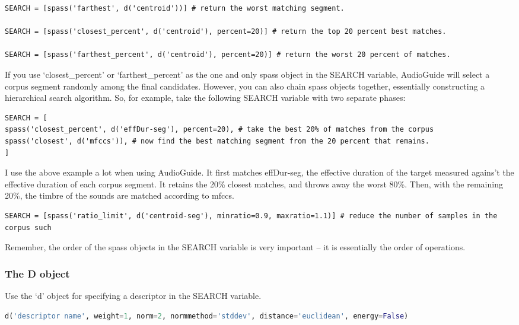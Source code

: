 \documentclass{article}
\newcommand{\ag}{AudioGuide}
\begin{document}
\begin{spacing}{1.2}
\begin{lstlisting}
SEARCH = [spass('farthest', d('centroid'))] # return the worst matching segment.

SEARCH = [spass('closest_percent', d('centroid'), percent=20)] # return the top 20 percent best matches.

SEARCH = [spass('farthest_percent', d('centroid'), percent=20)] # return the worst 20 percent of matches.
\end{lstlisting}

If you use `closest\_percent' or `farthest\_percent' as the one and only spass object in the SEARCH variable, AudioGuide will select a corpus segment randomly among the final candidates.  However, you can also chain spass objects together, essentially constructing a hierarchical search algorithm.  So, for example, take the following SEARCH variable with two separate phases:

\begin{lstlisting}
SEARCH = [
spass('closest_percent', d('effDur-seg'), percent=20), # take the best 20% of matches from the corpus
spass('closest', d('mfccs')), # now find the best matching segment from the 20 percent that remains.
] 
\end{lstlisting}

I use the above example a lot when using \ag.  It first matches effDur-seg, the effective duration of the target measured agains't the effective duration of each corpus segment.  It retains the 20\% closest matches, and throws away the worst 80\%.  Then, with the remaining 20\%, the timbre of the sounds are matched according to mfccs.

\begin{lstlisting}
SEARCH = [spass('ratio_limit', d('centroid-seg'), minratio=0.9, maxratio=1.1)] # reduce the number of samples in the corpus such 
\end{lstlisting}

Remember, the order of the spass objects in the SEARCH variable is very important -- it is essentially the order of operations.

\subsubsection{The D object}
Use the `d' object for specifying a descriptor in the SEARCH variable.

 \begin{lstlisting}[language=python]
d('descriptor name', weight=1, norm=2, normmethod='stddev', distance='euclidean', energy=False)
\end{lstlisting}
 

\end{spacing}
\end{document}
